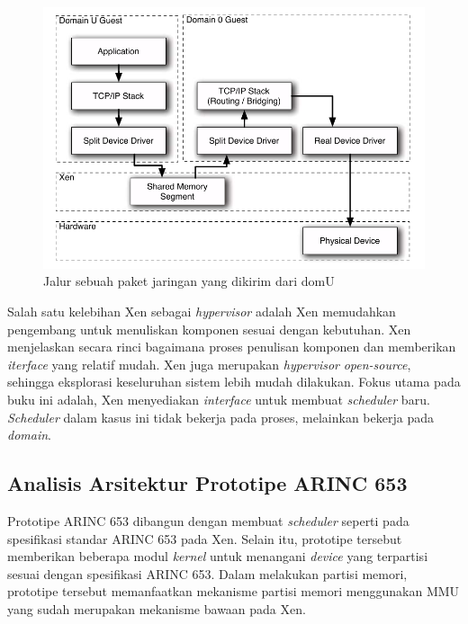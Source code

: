 \begin{figure}[htbp]
    \includegraphics[scale=0.5]{./resources/xen-split-driver.png}
    \caption[Jalur sebuah paket jaringan yang dikirim dari domU]{Jalur sebuah paket jaringan yang dikirim dari domU \citep{Chisnall2014}}
    \label{figure:xen_split_driver}
\end{figure}

Salah satu kelebihan Xen sebagai \textit{hypervisor} adalah Xen memudahkan pengembang untuk menuliskan komponen sesuai dengan kebutuhan.
Xen menjelaskan secara rinci bagaimana proses penulisan komponen dan memberikan \textit{iterface} yang relatif mudah.
Xen juga merupakan \textit{hypervisor} \textit{open-source}, sehingga eksplorasi keseluruhan sistem lebih mudah dilakukan.
Fokus utama pada buku ini adalah, Xen menyediakan \textit{interface} untuk membuat \textit{scheduler} baru.
\textit{Scheduler} dalam kasus ini tidak bekerja pada proses, melainkan bekerja pada \textit{domain}.

\subsection{Analisis Arsitektur Prototipe ARINC 653}

Prototipe ARINC 653 dibangun dengan membuat \textit{scheduler} seperti pada spesifikasi standar ARINC 653 pada Xen.
Selain itu, prototipe tersebut memberikan beberapa modul \textit{kernel} untuk menangani \textit{device} yang terpartisi sesuai dengan spesifikasi ARINC 653.
Dalam melakukan partisi memori, prototipe tersebut memanfaatkan mekanisme partisi memori menggunakan MMU yang sudah merupakan mekanisme bawaan pada Xen.

